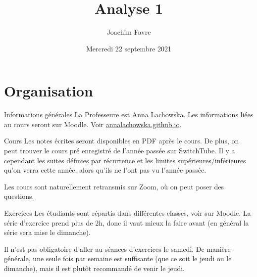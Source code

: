 \documentclass{article}
\title{Analyse 1}
\author{Joachim Favre}
\date{Mercredi 22 septembre 2021}
\begin{document}
\maketitle


\section{Organisation}
\begin{parag}{Informations générales}
    La Professeure est Anna Lachowska. Les informations liées au cours seront sur Moodle. Voir \url{annalachowska.github.io}.
\end{parag}

\begin{parag}{Cours}
    Les notes écrites seront disponibles en PDF après le cours. De plus, on peut trouver le cours pré enregistré de l'année passée sur SwitchTube. Il y a cependant les suites définies par récurrence et les limites supérieures/inférieures qu'on verra cette année, alors qu'ils ne l'ont pas vu l'année passée.

    Les cours sont naturellement retransmis sur Zoom, où on peut poser des questions. 
\end{parag}

\begin{parag}{Exercices}
    Les étudiants sont répartis dans différentes classes, voir sur Moodle. La série d'exercice prend plus de 2h, donc il vaut mieux la faire avant (en général la série sera mise le dimanche).

    Il n'est pas obligatoire d'aller au séances d'exercices le samedi. De manière générale, une seule fois par semaine est suffisante (que ce soit le jeudi ou le dimanche), mais il est plutôt recommandé de venir le jeudi.
\end{parag}
\end{document}
